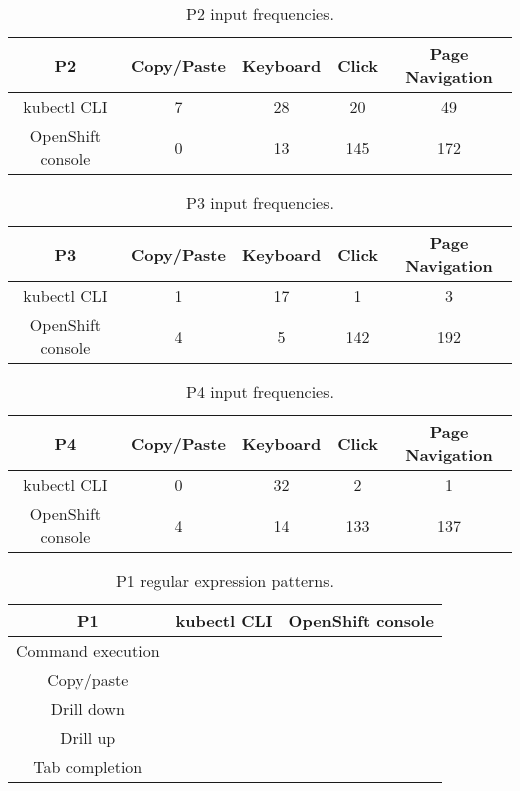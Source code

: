 \documentclass[11pt, oneside]{article}   	%
\begin{document}
\begin{table}
 \centering
  \begin{tabular}{ | c | c | c | c | c | } 
  \hline
  P2 & Copy/Paste & Keyboard & Click & Page Navigation \\ 
  \hline
  kubectl CLI & 7 & 28 & 20 & 49 \\ 
  \hline
  OpenShift console & 0 & 13 & 145 & 172 \\ 
  \hline
  \end{tabular}
 \caption{P2 input frequencies.}
\end{table}

\begin{table}
 \centering
  \begin{tabular}{ | c | c | c | c | c | } 
  \hline
  P3 & Copy/Paste & Keyboard & Click & Page Navigation \\ 
  \hline
  kubectl CLI & 1 & 17 & 1 & 3 \\ 
  \hline
  OpenShift console & 4 & 5 & 142 & 192 \\ 
  \hline
  \end{tabular}
 \caption{P3 input frequencies.}
\end{table}

\begin{table}
 \centering
  \begin{tabular}{ | c | c | c | c | c | } 
  \hline
  P4 & Copy/Paste & Keyboard & Click & Page Navigation \\ 
  \hline
  kubectl CLI & 0 & 32 & 2 & 1 \\ 
  \hline
  OpenShift console & 4 & 14 & 133 & 137 \\ 
  \hline
  \end{tabular}
 \caption{P4 input frequencies.}
\end{table}

\begin{table}
 \centering
  \begin{tabular}{ | c | c | c | } 
  \hline
  P1 & kubectl CLI & OpenShift console \\ 
  \hline
  Command execution &  &  \\ 
  \hline
  Copy/paste & & \\
  \hline
  Drill down & & \\
  \hline
  Drill up & & \\
  \hline
  Tab completion & & \\
  \hline
  \end{tabular}
 \caption{P1 regular expression patterns.}
\end{table}
\end{document}
